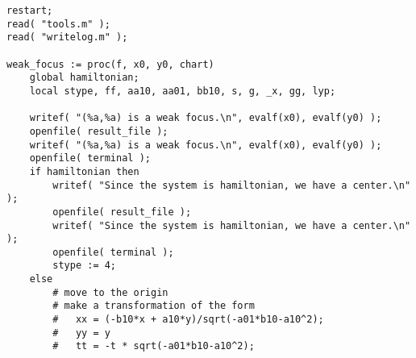 \documentclass[a4paper,10pt]{article}
\begin{document}
\begin{lstlisting}[name=weakfocus]
restart;
read( "tools.m" );
read( "writelog.m" );

weak_focus := proc(f, x0, y0, chart)
    global hamiltonian;
    local stype, ff, aa10, aa01, bb10, s, g, _x, gg, lyp;

    writef( "(%a,%a) is a weak focus.\n", evalf(x0), evalf(y0) );
    openfile( result_file );
    writef( "(%a,%a) is a weak focus.\n", evalf(x0), evalf(y0) );
    openfile( terminal );
    if hamiltonian then
        writef( "Since the system is hamiltonian, we have a center.\n" );
        openfile( result_file );
        writef( "Since the system is hamiltonian, we have a center.\n" );
        openfile( terminal );
        stype := 4;
    else
        # move to the origin
        # make a transformation of the form
        #   xx = (-b10*x + a10*y)/sqrt(-a01*b10-a10^2);
        #   yy = y
        #   tt = -t * sqrt(-a01*b10-a10^2);


\end{lstlisting}
\end{document}
